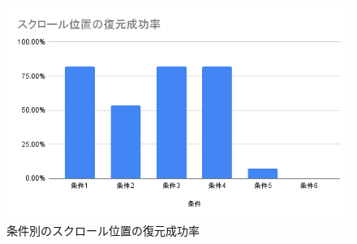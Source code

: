 \begin{figure}[htbp]
  \caption{条件別のスクロール位置の復元成功率}
  \label{fig:success-rate-scroll-position}
  \begin{center}
    \includegraphics[bb=0 0 600 371,width=15cm]{img/060_evaluation/result/scroll_position/success-rate-scroll-position.pdf}
  \end{center}
\end{figure}
